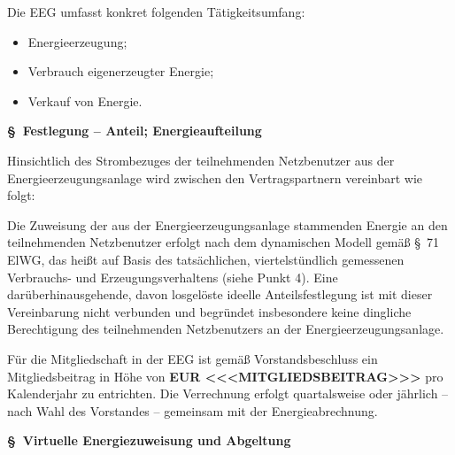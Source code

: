 \documentclass[a4paper,11pt]{article}
\newcounter{parasec}
\newcommand{\parasec}[1]{%
  \stepcounter{parasec}%
  \par\Needspace*{5\baselineskip}%
  \bigskip
  {\large\bfseries\color{tuerkis}\S\ \theparasec\quad #1}\par\nopagebreak
  \smallskip\nopagebreak
}
\begin{document}
Die EEG umfasst konkret folgenden Tätigkeitsumfang:

\begin{itemize}
  \item Energieerzeugung;
  \item Verbrauch eigenerzeugter Energie;
  \item Verkauf von Energie.
\end{itemize}

\parasec{Festlegung -- Anteil; Energieaufteilung}


Hinsichtlich des Strombezuges der teilnehmenden Netzbenutzer aus der Energieerzeugungsanlage wird zwischen den Vertragspartnern vereinbart wie folgt:

Die Zuweisung der aus der Energieerzeugungsanlage stammenden Energie an den teilnehmenden Netzbenutzer erfolgt nach dem dynamischen Modell gemäß \S\ 71 ElWG, das heißt auf Basis des tatsächlichen, viertelstündlich gemessenen Verbrauchs- und Erzeugungsverhaltens (siehe Punkt 4). Eine darüberhinausgehende, davon losgelöste ideelle Anteilsfestlegung ist mit dieser Vereinbarung nicht verbunden und begründet insbesondere keine dingliche Berechtigung des teilnehmenden Netzbenutzers an der Energieerzeugungsanlage.

Für die Mitgliedschaft in der EEG ist gemäß Vorstandsbeschluss ein Mitgliedsbeitrag in Höhe von \textbf{EUR <<<MITGLIEDSBEITRAG>>>} pro Kalenderjahr zu entrichten. Die Verrechnung erfolgt quartalsweise oder jährlich -- nach Wahl des Vorstandes -- gemeinsam mit der Energieabrechnung.

\parasec{Virtuelle Energiezuweisung und Abgeltung}
\end{document}
